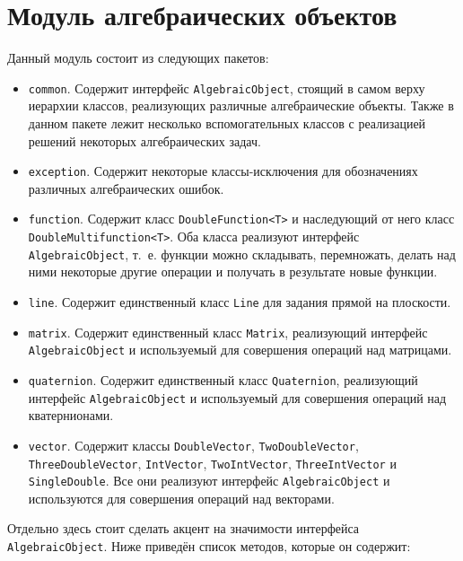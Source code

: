 \section{Модуль алгебраических объектов}

Данный модуль состоит из следующих пакетов:

\begin{itemize}

\item \texttt{common}. Содержит интерфейс \texttt{Algebraic\-Object}, стоящий в самом верху иерархии классов,
реализующих различные алгебраические объекты. Также в данном пакете лежит несколько вспомогательных классов
с реализацией решений некоторых алгебраических задач.
\item \texttt{exception}. Содержит некоторые классы-исключения для обозначениях различных алгебраических ошибок.
\item \texttt{function}. Содержит класс \texttt{Double\-Function<T>} и наследующий от него класс
\texttt{Double\-Multifunction<T>}. Оба класса реализуют интерфейс \texttt{Al\-gebraic\-Object}, т.~е. функции можно
складывать, перемножать, делать над ними некоторые другие операции и получать в результате новые функции.
\item \texttt{line}. Содержит единственный класс \texttt{Line} для задания прямой на плоскости.
\item \texttt{matrix}. Содержит единственный класс \texttt{Matrix}, реализующий интерфейс \texttt{Al\-gebraic\-Object} и
используемый для совершения операций над матрицами.
\item \texttt{quaternion}. Содержит единственный класс \texttt{Quaternion}, реализующий интерфейс
\texttt{Algebraic\-Object} и используемый для совершения операций над кватернионами.
\item \texttt{vector}. Содержит классы \texttt{Double\-Vector}, \texttt{Two\-Double\-Vector},
\texttt{Three\-Double\-Vec\-tor}, \texttt{Int\-Vector}, \texttt{Two\-Int\-Vector}, \texttt{Three\-Int\-Vector} и
\texttt{Sin\-gle\-Double}. Все они реализуют интерфейс \texttt{Algebraic\-Object} и используются для совершения операций
над векторами.

\end{itemize}

Отдельно здесь стоит сделать акцент на значимости интерфейса \texttt{Algebra\-ic\-Object}. Ниже приведён список методов,
которые он содержит:

